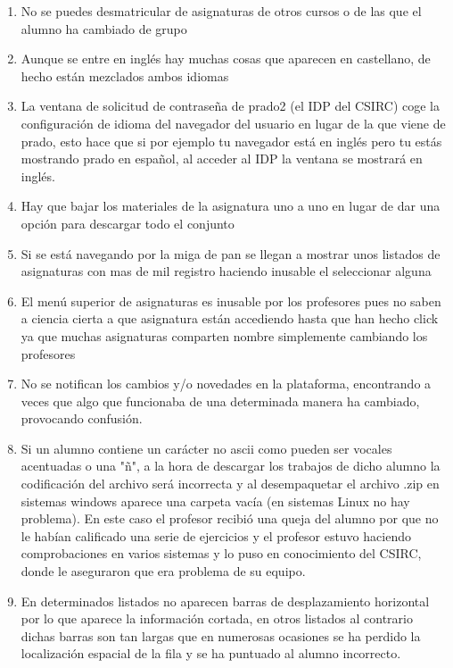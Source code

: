 \begin{enumerate}

\item No se puedes desmatricular de asignaturas de otros cursos o de las que el alumno ha cambiado de grupo

\item Aunque se entre en inglés hay muchas cosas que aparecen en castellano, de hecho están mezclados ambos idiomas

\item La ventana de solicitud de contraseña de prado2 (el IDP del CSIRC) coge la configuración de idioma del navegador del usuario en lugar de la que viene de prado, esto hace que si por ejemplo tu navegador está en inglés pero tu estás mostrando prado en español, al acceder al IDP la ventana se mostrará en inglés.

\item Hay que bajar los materiales de la asignatura uno a uno en lugar de dar una opción para descargar todo el conjunto

\item Si se está navegando por la miga de pan se llegan a mostrar unos listados de asignaturas con mas de mil registro haciendo inusable el seleccionar alguna

\item El menú superior de asignaturas es inusable por los profesores pues no saben a ciencia cierta a que asignatura están accediendo hasta que han hecho click ya que muchas asignaturas comparten nombre simplemente cambiando los profesores

\item No se notifican los cambios y/o novedades en la plataforma, encontrando a veces que algo que funcionaba de una determinada manera ha cambiado, provocando confusión.

\item Si un alumno contiene un carácter no ascii como pueden ser vocales acentuadas o una "ñ", a la hora de descargar los trabajos de dicho alumno la codificación del archivo será incorrecta y al desempaquetar el archivo .zip en sistemas windows aparece una carpeta vacía (en sistemas Linux no hay problema). En este caso el profesor recibió una queja del alumno por que no le habían calificado una serie de ejercicios y el profesor estuvo haciendo comprobaciones en varios sistemas y lo puso en conocimiento del CSIRC, donde le aseguraron que era problema de su equipo. 

\item En determinados listados no aparecen barras de desplazamiento horizontal por lo que aparece la información cortada, en otros listados al contrario dichas barras son tan largas que en numerosas  ocasiones se ha perdido la localización espacial de la fila y se ha puntuado al alumno incorrecto.


\end{enumerate}
